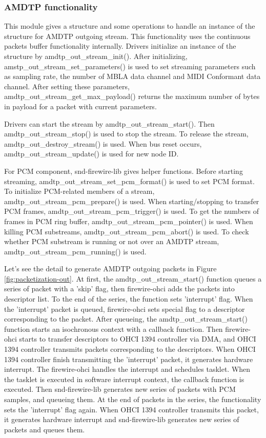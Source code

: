 \documentclass[onecolumn]{article}
\begin{document}
\subsubsection{AMDTP functionality}
\label{sec:packetization-out}

This module gives a structure and some operations to handle an instance of the structure for AMDTP outgoing stream. This functionality uses the continuous packets buffer functionality internally. Drivers initialize an instance of the structure by amdtp\_out\_stream\_init(). After initializing, amstp\_out\_stream\_set\_parameters() is used to set streaming parameters such as sampling rate, the number of MBLA data channel and MIDI Conformant data channel. After setting these parameters, amdtp\_out\_stream\_get\_max\_payload() returns the maximum number of bytes in payload for a packet with current parameters.

Drivers can start the stream by amdtp\_out\_stream\_start(). Then amdtp\_out\_stream\_stop() is used to stop the stream. To release the stream, amdtp\_out\_destroy\_stream() is used. When bus reset occurs, amdtp\_out\_stream\_update() is used for new node ID.

For PCM component, snd-firewire-lib gives helper functions. Before starting streaming, amdtp\_out\_stream\_set\_pcm\_format() is used to set PCM format. To initialize PCM-related members of a stream, amdtp\_out\_stream\_pcm\_prepare() is used. When starting/stopping to transfer PCM frames, amdtp\_out\_stream\_pcm\_trigger() is used. To get the numbers of frames in PCM ring buffer, amdtp\_out\_stream\_pcm\_pointer() is used. When killing PCM substreams, amdtp\_out\_stream\_pcm\_abort() is used. To check whether PCM substream is running or not over an AMDTP stream, amdtp\_out\_stream\_pcm\_running() is used.

Let's see the detail to generate AMDTP outgoing packets in Figure \ref{fig:packetization-out}. At first, the amdtp\_out\_stream\_start() function queues a series of packet with a 'skip' flag, then firewire-ohci adds the packets into descriptor list. To the end of the series, the function sets 'interrupt' flag. When the 'interrupt' packet is queued, firewire-ohci sets special flag to a descriptor corresponding to the packet. After queueing, the amdtp\_out\_stream\_start() function starts an isochronous context with a callback function. Then firewire-ohci starts to transfer descriptors to OHCI 1394 controller via DMA, and OHCI 1394 controller transmits packets corresponding to the descriptors. When OHCI 1394 controller finish transmitting the 'interrupt' packet, it generates hardware interrupt. The firewire-ohci handles the interrupt and schedules tasklet. When the tasklet is executed in software interrupt context, the callback function is executed. Then snd-firewire-lib generates new series of packets with PCM samples, and queueing them. At the end of packets in the series, the functionality sets the 'interrupt' flag again. When OHCI 1394 controller transmits this packet, it generates hardware interrupt and snd-firewire-lib generates new series of packets and queues them.
\end{document}
